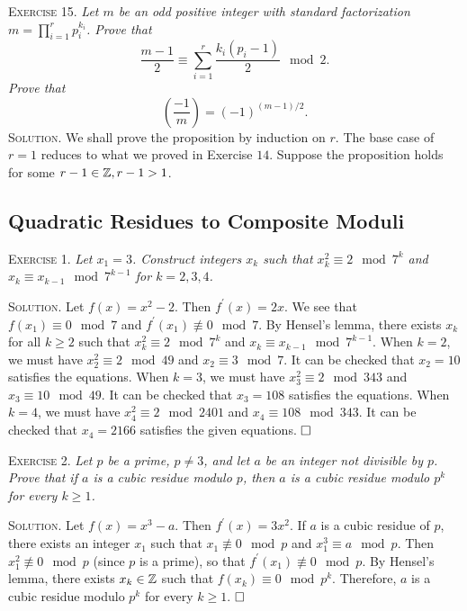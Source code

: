 \documentclass[11pt, leqno]{article}
\newcommand{\done}{\ensuremath{\hfill\square}}
\begin{document}
\textsc{Exercise 15}. \emph{Let $m$ be an odd positive integer with standard factorization $m = \prod_{i=1}^r p_i^{k_i}$. Prove that 
\begin{displaymath}
\frac{m-1}{2} \equiv \sum_{i=1}^r \frac{k_i(p_i-1)}{2} \mod 2.
\end{displaymath}Prove that 
\begin{displaymath}
\left( \frac{-1}{m} \right) = (-1)^{(m-1)/2}.
\end{displaymath}}\textsc{Solution}. We shall prove the proposition by induction on $r$. The base case of $r=1$ reduces to what we proved in Exercise $14$. Suppose the proposition holds for some $r-1\in \mathbb{Z}, r-1>1$.

\subsection{Quadratic Residues to Composite Moduli}

\textsc{Exercise 1}. \emph{Let $x_1 = 3$. Construct integers $x_k$ such that $x_k^2 \equiv 2 \mod 7^k$ and $x_k \equiv x_{k-1} \mod 7^{k-1}$ for $k=2,3,4$.}

\textsc{Solution}. Let $f(x) = x^2-2$. Then $f^{\prime}(x) = 2x$. We see that $f(x_1) \equiv 0 \mod 7$ and $f^{\prime}(x_1) \not\equiv 0 \mod 7$. By Hensel's lemma, there exists $x_k$ for all $k\geq 2$ such that $x_k^2 \equiv 2 \mod 7^k$ and $x_k \equiv x_{k-1} \mod 7^{k-1}$. When $k=2$, we must have $x_2^2 \equiv 2 \mod 49$ and $x_2 \equiv 3 \mod 7$. It can be checked that $x_2=10$ satisfies the equations. When $k=3$, we must have $x_3^2 \equiv 2 \mod 343$ and $x_3 \equiv 10 \mod 49$. It can be checked that $x_3 = 108$ satisfies the equations. When $k=4$, we must have $x_4^2 \equiv 2\mod 2401$ and $x_4 \equiv 108 \mod 343$. It can be checked that $x_4 = 2166$ satisfies the given equations. \done

\textsc{Exercise 2}. \emph{Let $p$ be a prime, $p\ne 3$, and let $a$ be an integer not divisible by $p$. Prove that if $a$ is a cubic residue modulo $p$, then $a$ is a cubic residue modulo $p^k$ for every $k \geq 1$.}

\textsc{Solution}. Let $f(x) = x^3 - a$. Then $f^{\prime}(x) = 3x^2$. If $a$ is a cubic residue of $p$, there exists an integer $x_1$ such that $x_1 \not \equiv 0 \mod p$ and $x_1^3 \equiv a \mod p$. Then $x_1^2 \not\equiv 0 \mod p$ (since $p$ is a prime), so that $f^{\prime}(x_1) \not\equiv 0 \mod p$. By Hensel's lemma, there exists $x_k \in \mathbb{Z}$ such that $f(x_k) \equiv 0 \mod p^k$. Therefore, $a$ is a cubic residue modulo $p^k$ for every $k\geq 1$. \done
\end{document}
